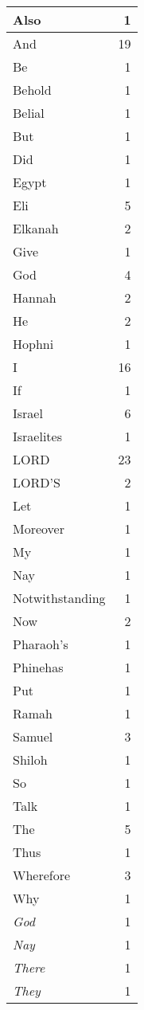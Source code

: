 \begin{center}
\begin{longtable}{l|r}
\hline \hline
\endlastfoot
Also & 1 \\ \hline
And & 19 \\ \hline
Be & 1 \\ \hline
Behold & 1 \\ \hline
Belial & 1 \\ \hline
But & 1 \\ \hline
Did & 1 \\ \hline
Egypt & 1 \\ \hline
Eli & 5 \\ \hline
Elkanah & 2 \\ \hline
Give & 1 \\ \hline
God & 4 \\ \hline
Hannah & 2 \\ \hline
He & 2 \\ \hline
Hophni & 1 \\ \hline
I & 16 \\ \hline
If & 1 \\ \hline
Israel & 6 \\ \hline
Israelites & 1 \\ \hline
LORD & 23 \\ \hline
LORD'S & 2 \\ \hline
Let & 1 \\ \hline
Moreover & 1 \\ \hline
My & 1 \\ \hline
Nay & 1 \\ \hline
Notwithstanding & 1 \\ \hline
Now & 2 \\ \hline
Pharaoh's & 1 \\ \hline
Phinehas & 1 \\ \hline
Put & 1 \\ \hline
Ramah & 1 \\ \hline
Samuel & 3 \\ \hline
Shiloh & 1 \\ \hline
So & 1 \\ \hline
Talk & 1 \\ \hline
The & 5 \\ \hline
Thus & 1 \\ \hline
Wherefore & 3 \\ \hline
Why & 1 \\ \hline
\emph{God} & 1 \\ \hline
\emph{Nay} & 1 \\ \hline
\emph{There} & 1 \\ \hline
\emph{They} & 1 \\ \hline

\end{longtable}
\end{center}
